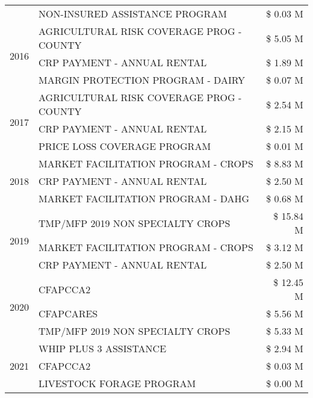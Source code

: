 \begin{tabular}{llr}
 & NON-INSURED ASSISTANCE PROGRAM & \$ 0.03 M \\
\cline{1-3}
\multirow[t]{3}{*}{2016} & AGRICULTURAL RISK COVERAGE PROG - COUNTY & \$ 5.05 M \\
 & CRP PAYMENT - ANNUAL RENTAL & \$ 1.89 M \\
 & MARGIN PROTECTION PROGRAM - DAIRY & \$ 0.07 M \\
\cline{1-3}
\multirow[t]{3}{*}{2017} & AGRICULTURAL RISK COVERAGE PROG - COUNTY & \$ 2.54 M \\
 & CRP PAYMENT - ANNUAL RENTAL & \$ 2.15 M \\
 & PRICE LOSS COVERAGE PROGRAM & \$ 0.01 M \\
\cline{1-3}
\multirow[t]{3}{*}{2018} & MARKET FACILITATION PROGRAM - CROPS & \$ 8.83 M \\
 & CRP PAYMENT - ANNUAL RENTAL & \$ 2.50 M \\
 & MARKET FACILITATION PROGRAM - DAHG & \$ 0.68 M \\
\cline{1-3}
\multirow[t]{3}{*}{2019} & TMP/MFP 2019 NON SPECIALTY CROPS & \$ 15.84 M \\
 & MARKET FACILITATION PROGRAM - CROPS & \$ 3.12 M \\
 & CRP PAYMENT - ANNUAL RENTAL & \$ 2.50 M \\
\cline{1-3}
\multirow[t]{3}{*}{2020} & CFAPCCA2 & \$ 12.45 M \\
 & CFAPCARES & \$ 5.56 M \\
 & TMP/MFP 2019 NON SPECIALTY CROPS & \$ 5.33 M \\
\cline{1-3}
\multirow[t]{3}{*}{2021} & WHIP PLUS 3 ASSISTANCE & \$ 2.94 M \\
 & CFAPCCA2 & \$ 0.03 M \\
 & LIVESTOCK FORAGE PROGRAM & \$ 0.00 M \\
\cline{1-3}
\bottomrule
\end{tabular}
